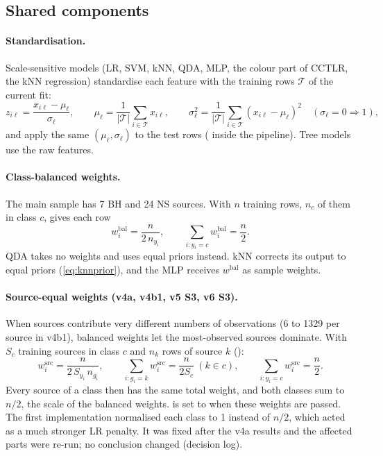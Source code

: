 \subsection{Shared components}\label{sec:shared}
\paragraph{Standardisation.} Scale-sensitive models (LR, SVM, kNN, QDA, MLP, the colour part of CCTLR, the kNN regression)
standardise each feature with the training rows $\mathcal T$ of the current fit:
\begin{equation}
z_{i\ell}=\frac{x_{i\ell}-\mu_\ell}{\sigma_\ell},\qquad\mu_\ell=\frac1{|\mathcal T|}\sum_{i\in\mathcal T}x_{i\ell},\qquad
\sigma_\ell^2=\frac1{|\mathcal T|}\sum_{i\in\mathcal T}(x_{i\ell}-\mu_\ell)^2\quad(\sigma_\ell=0\Rightarrow1),\label{eq:scaler}
\end{equation}
and apply the same $(\mu_\ell,\sigma_\ell)$ to the test rows ( inside the pipeline). Tree models use
the raw features.

\paragraph{Class-balanced weights.}\label{sec:weights} The main sample has 7 BH and 24 NS sources. With $n$ training rows,
$n_c$ of them in class $c$,  gives each row
\begin{equation}
w^\mathrm{bal}_i=\frac{n}{2\,n_{y_i}},\qquad\sum_{i:y_i=c}w^\mathrm{bal}_i=\frac n2.\label{eq:balanced}
\end{equation}
QDA takes no weights and uses equal priors instead. kNN corrects its output to equal priors (\cref{eq:knnprior}), and the MLP
receives $w^\mathrm{bal}$ as sample weights.

\paragraph{Source-equal weights (v4a, v4b1, v5 S3, v6 S3).} When sources contribute very different numbers of observations
(6 to 1329 per source in v4b1), balanced weights let the most-observed sources dominate. With $S_c$ training sources in
class $c$ and $n_k$ rows of source $k$ ():
\begin{equation}
w^\mathrm{src}_i=\frac{n}{2\,S_{y_i}\,n_{g_i}},\qquad\sum_{i:g_i=k}w^\mathrm{src}_i=\frac{n}{2S_c}\ (k\in c),\qquad\sum_{i:y_i=c}w^\mathrm{src}_i=\frac n2.\label{eq:sourceequal}
\end{equation}
Every source of a class then has the same total weight, and both classes sum to $n/2$, the scale of the balanced weights.
 is set to  when these weights are passed. The first implementation normalised each class to 1
instead of $n/2$, which acted as a much stronger LR penalty. It was fixed after the v4a results and the affected parts were
re-run; no conclusion changed (decision log).

